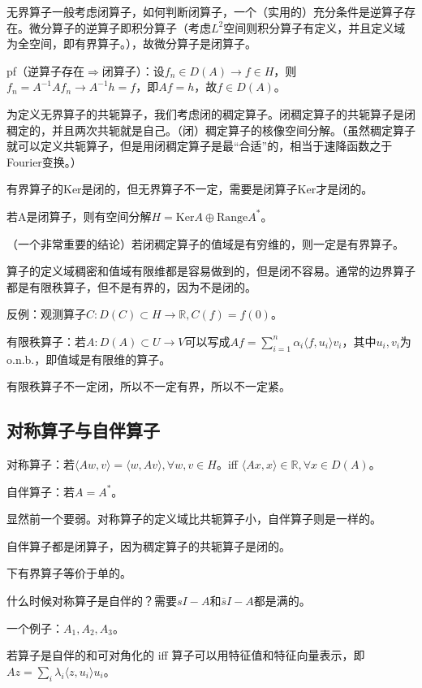 无界算子一般考虑闭算子，如何判断闭算子，一个（实用的）充分条件是逆算子存在。微分算子的逆算子即积分算子（考虑$L^2$空间则积分算子有定义，并且定义域为全空间，即有界算子。），故微分算子是闭算子。

pf（逆算子存在$\Rightarrow$闭算子）：设$f_n \in D(A) \to f \in H$，则$f_n = A^{-1} A f_n \to A^{-1} h = f$，即$Af = h$，故$f \in D(A)$。

为定义无界算子的共轭算子，我们考虑闭的稠定算子。闭稠定算子的共轭算子是闭稠定的，并且两次共轭就是自己。（闭）稠定算子的核像空间分解。（虽然稠定算子就可以定义共轭算子，但是用闭稠定算子是最“合适”的，相当于速降函数之于Fourier变换。）

有界算子的Ker是闭的，但无界算子不一定，需要是闭算子Ker才是闭的。

若A是闭算子，则有空间分解$H = \text{Ker}A \oplus \text{Range}A^{\ast}$。

（一个非常重要的结论）若闭稠定算子的值域是有穷维的，则一定是有界算子。

算子的定义域稠密和值域有限维都是容易做到的，但是闭不容易。通常的边界算子都是有限秩算子，但不是有界的，因为不是闭的。

反例：观测算子$C: D(C) \subset H \to \mathbb{R}, C(f) = f(0)$。

有限秩算子：若$A: D(A) \subset U \to V$可以写成$Af = \sum_{i = 1}^n \alpha_i \langle f, u_i \rangle v_i$，其中$u_i, v_i$为o.n.b.，即值域是有限维的算子。

有限秩算子不一定闭，所以不一定有界，所以不一定紧。

\subsection{对称算子与自伴算子}

对称算子：若$\langle A w, v \rangle = \langle w, A v \rangle, \forall w, v \in H$。iff $\langle Ax, x \rangle \in \mathbb{R}, \forall x \in D(A)$。

自伴算子：若$A = A^{\ast}$。

显然前一个要弱。对称算子的定义域比共轭算子小，自伴算子则是一样的。

自伴算子都是闭算子，因为稠定算子的共轭算子是闭的。

下有界算子等价于单的。

什么时候对称算子是自伴的？需要$sI - A$和$\bar{s}I - A$都是满的。

一个例子：$A_1, A_2, A_3$。

若算子是自伴的和可对角化的 iff 算子可以用特征值和特征向量表示，即$Az = \sum_i \lambda_i \langle z, u_i \rangle u_i$。

